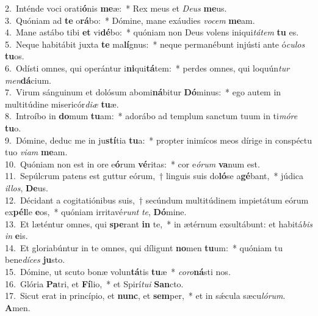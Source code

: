 {2.~}Inténde voci orati\textbf{ó}nis \textbf{me}æ:~* Rex meus et \textit{De}\textit{us} \textbf{me}us.\\
{3.~}Quóniam ad \textbf{te} o\textbf{rá}bo:~* Dómine, mane exáudies \textit{vo}\textit{cem} \textbf{me}am.\\
{4.~}Mane astábo tibi \textbf{et} vi\textbf{dé}bo:~* quóniam non Deus volens iniqui\textit{tá}\textit{tem} \textbf{tu} es.\\
{5.~}Neque habitábit juxta \textbf{te} ma\textbf{lí}gnus:~* neque permanébunt injústi ante ó\textit{cu}\textit{los} \textbf{tu}os.\\
{6.~}Odísti omnes, qui operántur i\textbf{ni}qui\textbf{tá}tem:~* perdes omnes, qui loquún\textit{tur} \textit{men}\textbf{dá}cium.\\
{7.~}Virum sánguinum et dolósum abomi\textbf{ná}bitur \textbf{Dó}minus:~* ego autem in multitúdine misericór\textit{di}\textit{æ} \textbf{tu}æ.\\
{8.~}Introíbo in \textbf{do}mum \textbf{tu}am:~* adorábo ad templum sanctum tuum in ti\textit{mó}\textit{re} \textbf{tu}o.\\
{9.~}Dómine, deduc me in ju\textbf{stí}tia \textbf{tu}a:~* propter inimícos meos dírige in conspéctu tuo \textit{vi}\textit{am} \textbf{me}am.\\
{10.~}Quóniam non est in ore e\textbf{ó}rum \textbf{vé}ritas:~* cor e\textit{ó}\textit{rum} \textbf{va}num est.\\
{11.~}Sepúlcrum patens est guttur eórum,~† linguis suis do\textbf{ló}se a\textbf{gé}bant,~* júdica \textit{il}\textit{los}, \textbf{De}us.\\
{12.~}Décidant a cogitatiónibus suis,~† secúndum multitúdinem impietátum eórum ex\textbf{pél}le \textbf{e}os,~* quóniam irritavé\textit{runt} \textit{te}, \textbf{Dó}mine.\\
{13.~}Et læténtur omnes, qui \textbf{spe}rant \textbf{in} te,~* in ætérnum exsultábunt: et habitá\textit{bis} \textit{in} \textbf{e}is.\\
{14.~}Et gloriabúntur in te omnes, qui díligunt \textbf{no}men \textbf{tu}um:~* quóniam tu bene\textit{dí}\textit{ces} \textbf{ju}sto.\\
{15.~}Dómine, ut scuto bonæ volun\textbf{tá}tis \textbf{tu}æ~* \textit{co}\textit{ro}\textbf{ná}sti nos.\\
{16.~}Glória \textbf{Pa}tri, et \textbf{Fí}lio,~* et Spirí\textit{tu}\textit{i} \textbf{San}cto.\\
{17.~}Sicut erat in princípio, et \textbf{nunc}, et \textbf{sem}per,~* et in sǽcula sæcu\textit{ló}\textit{rum}. \textbf{A}men.\\
